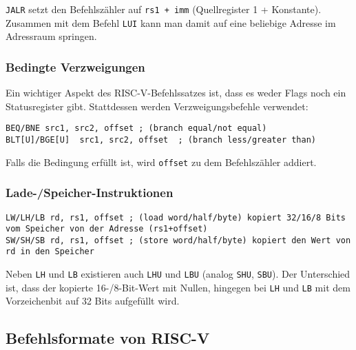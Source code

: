 \lstinline[style=risc-v_Assembler]!JALR! setzt den Befehlszähler auf \lstinline[style=risc-v_Assembler]!rs1 + imm! (Quellregister 1 + Konstante). Zusammen mit dem Befehl \lstinline[style=risc-v_Assembler]!LUI! kann
man damit auf eine beliebige Adresse im Adressraum springen.

\subsubsection{Bedingte Verzweigungen}

Ein wichtiger Aspekt des RISC-V-Befehlssatzes ist, dass es weder Flags noch ein Statusregister gibt. Stattdessen
werden Verzweigungsbefehle verwendet:

\begin{lstlisting}[style=risc-v_Assembler]
BEQ/BNE src1, src2, offset ; (branch equal/not equal)
BLT[U]/BGE[U]  src1, src2, offset  ; (branch less/greater than)
\end{lstlisting}

Falls die Bedingung erfüllt ist, wird \lstinline[style=risc-v_Assembler]!offset! zu dem Befehlszähler addiert.

\subsubsection{Lade-/Speicher-Instruktionen}

\begin{lstlisting}[style=risc-v_Assembler]
LW/LH/LB rd, rs1, offset ; (load word/half/byte) kopiert 32/16/8 Bits vom Speicher von der Adresse (rs1+offset)
SW/SH/SB rd, rs1, offset ; (store word/half/byte) kopiert den Wert von rd in den Speicher
\end{lstlisting}

Neben \lstinline[style=risc-v_Assembler]!LH! und \lstinline[style=risc-v_Assembler]!LB! existieren auch \lstinline[style=risc-v_Assembler]!LHU! und \lstinline[style=risc-v_Assembler]!LBU! (analog \lstinline[style=risc-v_Assembler]!SHU!, \lstinline[style=risc-v_Assembler]!SBU!). Der Unterschied ist, dass der
kopierte 16-/8-Bit-Wert mit Nullen, hingegen bei \lstinline[style=risc-v_Assembler]!LH! und \lstinline[style=risc-v_Assembler]!LB! mit dem Vorzeichenbit auf 32 Bits aufgefüllt wird.

\subsection{Befehlsformate von RISC-V}

